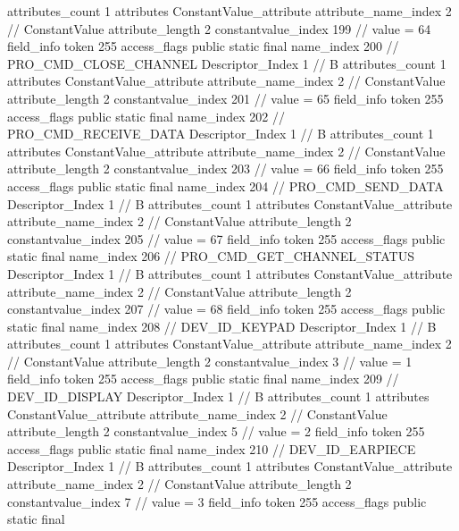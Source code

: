 {{{{{				attributes_count	1
				attributes {
				ConstantValue_attribute {
					attribute_name_index	2		// ConstantValue
					attribute_length	2
					constantvalue_index	199		// value = 64
				}
				}
			}
			field_info {
				token	255
				access_flags	public static final
				name_index	200		// PRO_CMD_CLOSE_CHANNEL
				Descriptor_Index	1		// B
				attributes_count	1
				attributes {
				ConstantValue_attribute {
					attribute_name_index	2		// ConstantValue
					attribute_length	2
					constantvalue_index	201		// value = 65
				}
				}
			}
			field_info {
				token	255
				access_flags	public static final
				name_index	202		// PRO_CMD_RECEIVE_DATA
				Descriptor_Index	1		// B
				attributes_count	1
				attributes {
				ConstantValue_attribute {
					attribute_name_index	2		// ConstantValue
					attribute_length	2
					constantvalue_index	203		// value = 66
				}
				}
			}
			field_info {
				token	255
				access_flags	public static final
				name_index	204		// PRO_CMD_SEND_DATA
				Descriptor_Index	1		// B
				attributes_count	1
				attributes {
				ConstantValue_attribute {
					attribute_name_index	2		// ConstantValue
					attribute_length	2
					constantvalue_index	205		// value = 67
				}
				}
			}
			field_info {
				token	255
				access_flags	public static final
				name_index	206		// PRO_CMD_GET_CHANNEL_STATUS
				Descriptor_Index	1		// B
				attributes_count	1
				attributes {
				ConstantValue_attribute {
					attribute_name_index	2		// ConstantValue
					attribute_length	2
					constantvalue_index	207		// value = 68
				}
				}
			}
			field_info {
				token	255
				access_flags	public static final
				name_index	208		// DEV_ID_KEYPAD
				Descriptor_Index	1		// B
				attributes_count	1
				attributes {
				ConstantValue_attribute {
					attribute_name_index	2		// ConstantValue
					attribute_length	2
					constantvalue_index	3		// value = 1
				}
				}
			}
			field_info {
				token	255
				access_flags	public static final
				name_index	209		// DEV_ID_DISPLAY
				Descriptor_Index	1		// B
				attributes_count	1
				attributes {
				ConstantValue_attribute {
					attribute_name_index	2		// ConstantValue
					attribute_length	2
					constantvalue_index	5		// value = 2
				}
				}
			}
			field_info {
				token	255
				access_flags	public static final
				name_index	210		// DEV_ID_EARPIECE
				Descriptor_Index	1		// B
				attributes_count	1
				attributes {
				ConstantValue_attribute {
					attribute_name_index	2		// ConstantValue
					attribute_length	2
					constantvalue_index	7		// value = 3
				}
				}
			}
			field_info {
				token	255
				access_flags	public static final
}}}}}
